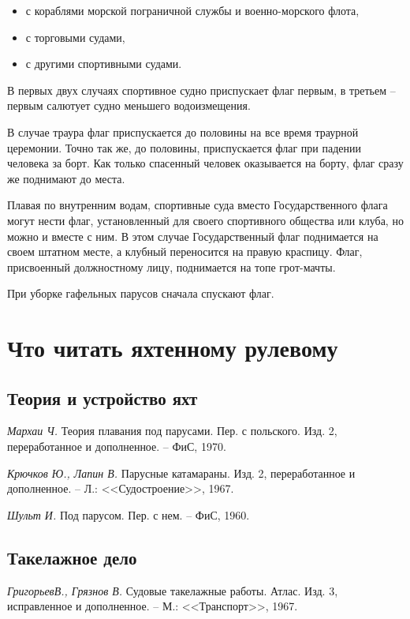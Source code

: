 \documentclass[a4paper, 12pt, twoside, final]{scrbook}
\begin{document}
\begin{itemize}
\item с кораблями морской пограничной службы и военно-морского флота,
\item с торговыми судами,
\item с другими спортивными    судами.
\end{itemize}


В первых двух случаях спортивное судно приспускает флаг первым, в третьем \--- первым салютует судно меньшего водоизмещения.

В случае траура флаг приспускается до половины на все время траурной церемонии. Точно так же, до половины, приспускается флаг при падении человека за борт. Как только спасенный человек оказывается на борту, флаг сразу же поднимают до места.

Плавая по внутренним водам, спортивные суда вместо Государственного флага могут нести флаг, установленный для своего спортивного общества или клуба, но можно и вместе с ним. В этом случае Государственный флаг поднимается на своем штатном месте, а клубный переносится на правую краспицу. Флаг, присвоенный должностному лицу, поднимается на топе грот-мачты.

При уборке гафельных парусов сначала спускают флаг.

\chapter{Что читать яхтенному рулевому}

\section*{Теория и устройство яхт}

\textit{Мархаи Ч.} Теория плавания под парусами. Пер. с польского. Изд. 2, переработанное и дополненное. \--- ФиС, 1970.

\textit{Крючков Ю., Лапин В.} Парусные катамараны. Изд. 2, переработанное и дополненное. \--- Л.: <<Судостроение>>, 1967.

\textit{Шульт И.} Под парусом. Пер. с нем. \--- ФиС, 1960.

\section*{Такелажное дело}

\textit{ГригорьевВ., Грязнов В.} Судовые такелажные работы. Атлас. Изд. 3, исправленное и дополненное. \--- М.: <<Транспорт>>, 1967.
\end{document}
